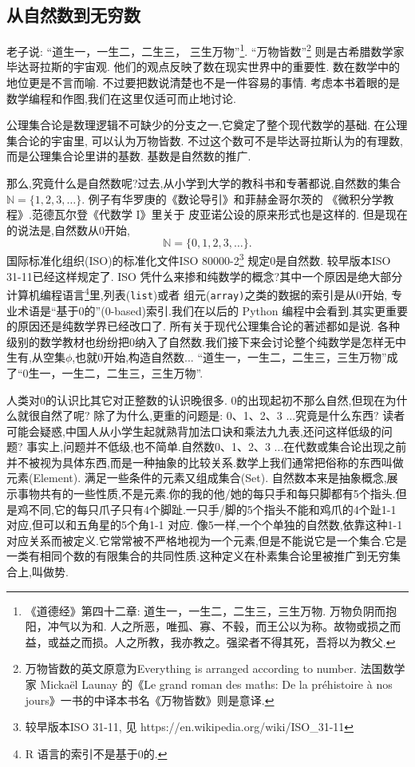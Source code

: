 \documentclass[main.tex]{subfiles}
\begin{document}
\subsection{从自然数到无穷数}
老子说: “道生一，一生二，二生三，
三生万物”\footnote{《道德经》第四十二章: 道生一，一生二，二生三，三生万物. 万物负阴而抱阳，冲气以为和. 人之所恶，唯孤、寡、不毂，而王公以为称。故物或损之而益，或益之而损。人之所教，我亦教之。强梁者不得其死，吾将以为教父.}.
“万物皆数”\footnote{万物皆数的英文原意为Everything is arranged according to number. 
	法国数学家 Mickaël Launay 的《Le grand roman des maths: De la préhistoire à nos jours》一书的中译本书名《万物皆数》则是意译.}
则是古希腊数学家毕达哥拉斯的宇宙观. 他们的观点反映了数在现实世界中的重要性. 数在数学中的地位更是不言而喻.
不过要把数说清楚也不是一件容易的事情. 考虑本书着眼的是数学编程和作图,我们在这里仅适可而止地讨论. 

公理集合论是数理逻辑不可缺少的分支之一,它奠定了整个现代数学的基础. 在公理集合论的宇宙里, 可以认为万物皆数. 
不过这个数可不是毕达哥拉斯认为的有理数, 而是公理集合论里讲的基数.
基数是自然数的推广.

那么,究竟什么是自然数呢?过去,从小学到大学的教科书和专著都说,自然数的集合$\mathbb{N} = \{1, 2, 3, \dots\}$.
例子有华罗庚的《数论导引》\cite{HuaL}和菲赫金哥尔茨的
《微积分学教程》\cite{FeiH1}.范德瓦尔登《代数学 I》\cite{derWaerden}里关于
皮亚诺公设的原来形式也是这样的.
但是现在的说法是,自然数从0开始, 
$$\mathbb{N} = \{0,1, 2, 3, \dots\}.$$
 国际标准化组织(ISO)的标准化文件ISO 80000-2\footnote{较早版本ISO 31-11, 见  https://en.wikipedia.org/wiki/ISO\_31-11}
 规定0是自然数. 较早版本ISO 31-11已经这样规定了. ISO 凭什么来掺和纯数学的概念?其中一个原因是绝大部分计算机编程语言\footnote{R 语言的索引不是基于0的.}里,列表(\texttt{list})或者
 组元(\texttt{array)}之类的数据的索引是从0开始,
 专业术语是“基于0的”(0-based)索引.我们在以后的 Python 编程中会看到.其实更重要的原因还是纯数学界已经改口了.
 所有关于现代公理集合论的著述都如是说\cite{HalmosP}\cite{KelleyJ}\cite{JiangJi}. 各种级别的数学教材也纷纷把0纳入了自然数.我们接下来会讨论整个纯数学是怎样无中生有,从空集$\phi$,也就0开始,构造自然数... 
“道生一，一生二，二生三，三生万物”成了“0生一，一生二，二生三，三生万物”.

人类对0的认识比其它对正整数的认识晚很多. 0的出现起初不那么自然,但现在为什么就很自然了呢?
除了为什么,更重的问题是: 0、1、2、3 ...究竟是什么东西?
读者可能会疑惑,中国人从小学生起就熟背加法口诀和乘法九九表,还问这样低级的问题?
事实上,问题并不低级,也不简单.自然数0、1、2、3 ...在代数或集合论出现之前并不被视为具体东西,而是一种抽象的比较关系.数学上我们通常把俗称的东西叫做元素(Element).
满足一些条件的元素又组成集合(Set).
自然数本来是抽象概念,展示事物共有的一些性质,不是元素.你的我的他/她的每只手和每只脚都有5个指头.但是鸡不同,它的每只爪子只有4个脚趾.一只手/脚的5个指头不能和鸡爪的4个趾1-1 对应,但可以和五角星的5个角1-1 对应.
像5一样,一个个单独的自然数,依靠这种1-1 对应关系而被定义.它常常被不严格地视为一个元素,但是不能说它是一个集合.它是一类有相同个数的有限集合的共同性质.这种定义在朴素集合论里被推广到无穷集合上,叫做势.
\end{document}
